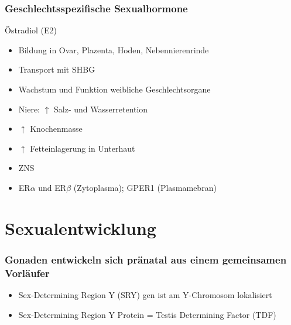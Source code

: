 \documentclass{beamer}
\begin{document}
\begin{frame}
 \frametitle{Geschlechtsspezifische Sexualhormone}


\begin{block}{Östradiol (E2)}
\begin{itemize}
\item

Bildung in Ovar, Plazenta, Hoden, Nebennierenrinde
\item
Transport mit SHBG
\item
 Wachstum und Funktion weibliche Geschlechtsorgane
\item
Niere: \(\uparrow\) Salz- und Wasserretention
 \item
 \(\uparrow\) Knochenmasse
\item
 \(\uparrow\) Fetteinlagerung in Unterhaut
\item
 ZNS
\item
ER\(\alpha\) und ER\(\beta\) (Zytoplasma); GPER1 (Plasmamebran)


\end{itemize}
\end{block}

\end{frame}



\section{Sexualentwicklung}


\begin{frame}
\frametitle{Gonaden entwickeln sich pränatal aus einem gemeinsamen Vorläufer}


\begin{itemize}
    \item 
 Sex-Determining Region Y (SRY) gen ist am Y-Chromosom lokalisiert
 \item
 Sex-Determining Region Y Protein = Testis Determining Factor    (TDF)
    



\end{itemize}

\end{frame}
\end{document}
